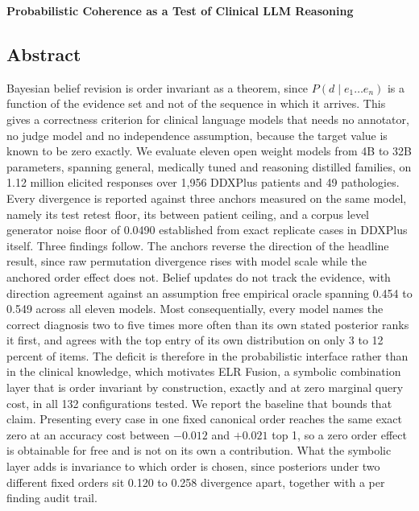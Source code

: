 \documentclass[10pt]{article}
\begin{document}
\small

\begin{center}
{\large\bfseries Probabilistic Coherence as a Test of Clinical LLM Reasoning}
\end{center}
\vspace{-2pt}

\subsection*{Abstract}
\footnotesize
Bayesian belief revision is order invariant as a theorem, since $P(d \mid e_1 \dots e_n)$ is a
function of the evidence set and not of the sequence in which it arrives. This gives a correctness
criterion for clinical language models that needs no annotator, no judge model and no independence
assumption, because the target value is known to be zero exactly. We evaluate eleven open weight
models from 4B to 32B parameters, spanning general, medically tuned and reasoning distilled
families, on 1.12 million elicited responses over 1{,}956 DDXPlus patients and 49 pathologies.
Every divergence is reported against three anchors measured on the same model, namely its test
retest floor, its between patient ceiling, and a corpus level generator noise floor of 0.0490
established from exact replicate cases in DDXPlus itself. Three findings follow. The anchors
reverse the direction of the headline result, since raw permutation divergence rises with model
scale while the anchored order effect does not. Belief updates do not track the evidence, with
direction agreement against an assumption free empirical oracle spanning 0.454 to 0.549 across all
eleven models. Most consequentially, every model names the correct diagnosis two to five times more
often than its own stated posterior ranks it first, and agrees with the top entry of its own
distribution on only 3 to 12 percent of items. The deficit is therefore in the probabilistic
interface rather than in the clinical knowledge, which motivates ELR Fusion, a symbolic combination
layer that is order invariant by construction, exactly and at zero marginal query cost, in all 132
configurations tested. We report the baseline that bounds that claim. Presenting every case in one
fixed canonical order reaches the same exact zero at an accuracy cost between $-0.012$ and $+0.021$
top 1, so a zero order effect is obtainable for free and is not on its own a contribution. What the
symbolic layer adds is invariance to which order is chosen, since posteriors under two different
fixed orders sit 0.120 to 0.258 divergence apart, together with a per finding audit trail.
\small
\end{document}
